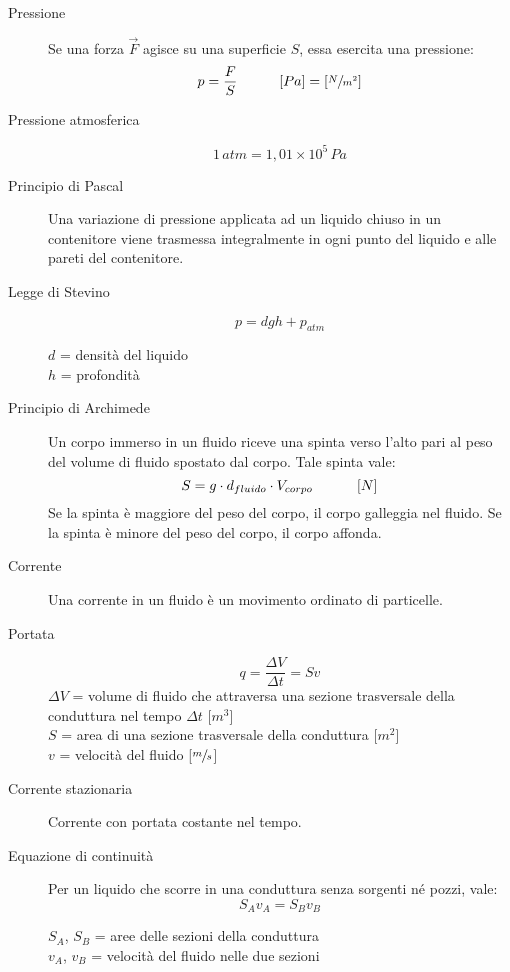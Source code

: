 \documentclass[a4paper,11pt,italian]{article}
\begin{document}
\begin{description}
  \item[Pressione] 
  Se una forza $ \vec{F} $ agisce su una superficie $ S $, essa esercita una pressione:
  \[ p = \frac{F}{S} \hspace*{3em} [Pa] = \left[ \sfrac{N}{m^2} \right] \]
  
  \item[Pressione atmosferica]
  \[ 1 \, atm = 1,01 \times 10^5 \, Pa \]
  
  \item[Principio di Pascal] 
  Una variazione di pressione applicata ad un liquido chiuso in un contenitore viene trasmessa integralmente in ogni punto del liquido e alle pareti del contenitore.
  
  \item[Legge di Stevino]
  \[ p = dgh + p_{atm} \]
  \begin{multicols}{2}
  $ d $ = densità del liquido\\
  $ h $ = profondità
  \end{multicols}
  
  \item[Principio di Archimede] 
  Un corpo immerso in un fluido riceve una spinta verso l'alto pari al peso del volume di fluido spostato dal corpo. Tale spinta vale:
  \[ S = g \cdot d_{fluido} \cdot V_{corpo} \hspace*{3em} \left[ N \right] \]
  Se la spinta è maggiore del peso del corpo, il corpo galleggia nel fluido. Se la spinta è minore del peso del corpo, il corpo affonda.
  
  \item[Corrente] 
  Una corrente in un fluido è un movimento ordinato di particelle.
  
  \item[Portata]
  \[ q = \frac{\Delta V}{\Delta t} = Sv \]
  $ \Delta V $ = volume di fluido che attraversa una sezione trasversale della conduttura nel tempo $ \Delta t $ [$ m^3 $]\\
  $ S $ = area di una sezione trasversale della conduttura [$ m^2 $]\\
  $ v $ = velocità del fluido [$ \sfrac{m}{s} $]

  \item[Corrente stazionaria] Corrente con portata costante nel tempo.
  
  \item[Equazione di continuità] Per un liquido che scorre in una conduttura senza sorgenti né pozzi, vale:
  \[ S_A v_A = S_B v_B  \]
  \begin{multicols}{2}
  $ S_A $, $ S_B $ = aree delle sezioni della conduttura\\
  $ v_A $, $ v_B $ = velocità del fluido nelle due sezioni
  \end{multicols}
  

\end{description}
\end{document}
